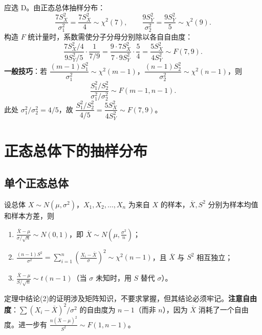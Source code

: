\documentclass[lang=cn,11pt]{elegantbook}
\begin{document}
\begin{solution}
应选 D。由正态总体抽样分布：
\[
\frac{7S_X^2}{\sigma_1^2}=\frac{7S_X^2}{4}\sim\chi^2(7),\qquad \frac{9S_Y^2}{\sigma_2^2}=\frac{9S_Y^2}{5}\sim\chi^2(9).
\]
构造 \(F\) 统计量时，系数需使分子分母分别除以各自自由度：
\[
\frac{7S_X^2/4}{9S_Y^2/5}\cdot\frac{1}{7/9}=\frac{9\cdot 7S_X^2}{7\cdot 9S_Y^2}\cdot\frac{5}{4}=\frac{5S_X^2}{4S_Y^2}\sim F(7,9).
\]
\textbf{一般技巧}：若 \(\dfrac{(m-1)S_1^2}{\sigma_1^2}\sim\chi^2(m{-}1)\)，\(\dfrac{(n-1)S_2^2}{\sigma_2^2}\sim\chi^2(n{-}1)\)，则
\[
\frac{S_1^2/S_2^2}{\sigma_1^2/\sigma_2^2}\sim F(m{-}1,n{-}1).
\]
此处 \(\sigma_1^2/\sigma_2^2=4/5\)，故 \(\dfrac{S_1^2/S_2^2}{4/5}=\dfrac{5S_X^2}{4S_Y^2}\sim F(7,9)\)。
\end{solution}



\section{正态总体下的抽样分布}

\subsection{单个正态总体}

\begin{theorem}[单正态总体抽样分布] \label{thm:normal-single}
设总体 \(X \sim N(\mu, \sigma^2)\)，\(X_1, X_2, \dots, X_n\) 为来自 \(X\) 的样本，\(\overline{X}, S^2\) 分别为样本均值和样本方差，则
\begin{enumerate}
    \item \(\displaystyle\frac{\overline{X} - \mu}{\sigma/\sqrt{n}} \sim N(0,1)\)，即 \(\overline{X} \sim N\!\left(\mu, \frac{\sigma^2}{n}\right)\)；
    \item \(\displaystyle\frac{(n-1)S^2}{\sigma^2} = \sum_{i=1}^{n}\!\left(\frac{X_i - \overline{X}}{\sigma}\right)^{\!2} \sim \chi^2(n-1)\)，且 \(\overline{X}\) 与 \(S^2\) 相互独立；
    \item \(\displaystyle\frac{\overline{X} - \mu}{S/\sqrt{n}} \sim t(n-1)\)（当 \(\sigma\) 未知时，用 \(S\) 替代 \(\sigma\)）。
\end{enumerate}
\end{theorem}

\begin{note}
定理中结论(2)的证明涉及矩阵知识，不要求掌握，但其结论必须牢记。\textbf{注意自由度}：\(\sum(X_i-\overline{X})^2/\sigma^2\) 的自由度为 \(n-1\)（而非 \(n\)），因为 \(\overline{X}\) 消耗了一个自由度。进一步有 \(\displaystyle\frac{n(\overline{X}-\mu)^2}{S^2} \sim F(1,n-1)\)。
\end{note}
\end{document}
